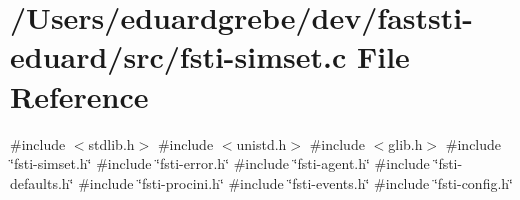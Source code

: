 \hypertarget{fsti-simset_8c}{}\section{/\+Users/eduardgrebe/dev/faststi-\/eduard/src/fsti-\/simset.c File Reference}
\label{fsti-simset_8c}
{\ttfamily \#include $<$stdlib.\+h$>$}\newline
{\ttfamily \#include $<$unistd.\+h$>$}\newline
{\ttfamily \#include $<$glib.\+h$>$}\newline
{\ttfamily \#include \char`\"{}fsti-\/simset.\+h\char`\"{}}\newline
{\ttfamily \#include \char`\"{}fsti-\/error.\+h\char`\"{}}\newline
{\ttfamily \#include \char`\"{}fsti-\/agent.\+h\char`\"{}}\newline
{\ttfamily \#include \char`\"{}fsti-\/defaults.\+h\char`\"{}}\newline
{\ttfamily \#include \char`\"{}fsti-\/procini.\+h\char`\"{}}\newline
{\ttfamily \#include \char`\"{}fsti-\/events.\+h\char`\"{}}\newline
{\ttfamily \#include \char`\"{}fsti-\/config.\+h\char`\"{}}\newline
